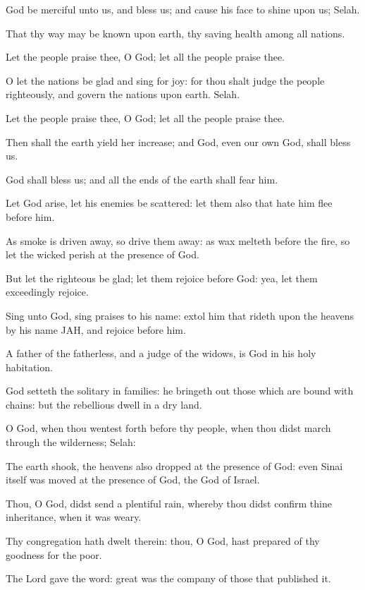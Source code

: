 \Chapter
\Verse God be merciful unto us, and bless us; and cause his face to shine upon us; Selah.

\Verse That thy way may be known upon earth, thy saving health among all nations.

\Verse Let the people praise thee, O God; let all the people praise thee.

\Verse O let the nations be glad and sing for joy: for thou shalt judge the people righteously, and govern the nations upon earth. Selah.

\Verse Let the people praise thee, O God; let all the people praise thee.

\Verse Then shall the earth yield her increase; and God, even our own God, shall bless us.

\Verse God shall bless us; and all the ends of the earth shall fear him.




\Chapter
\Verse Let God arise, let his enemies be scattered: let them also that hate him flee before him.

\Verse As smoke is driven away, so drive them away: as wax melteth before the fire, so let the wicked perish at the presence of God.

\Verse But let the righteous be glad; let them rejoice before God: yea, let them exceedingly rejoice.

\Verse Sing unto God, sing praises to his name: extol him that rideth upon the heavens by his name JAH, and rejoice before him.

\Verse A father of the fatherless, and a judge of the widows, is God in his holy habitation.

\Verse God setteth the solitary in families: he bringeth out those which are bound with chains: but the rebellious dwell in a dry land.

\Verse O God, when thou wentest forth before thy people, when thou didst march through the wilderness; Selah:

\Verse The earth shook, the heavens also dropped at the presence of God: even Sinai itself was moved at the presence of God, the God of Israel.

\Verse Thou, O God, didst send a plentiful rain, whereby thou didst confirm thine inheritance, when it was weary.

\Verse Thy congregation hath dwelt therein: thou, O God, hast prepared of thy goodness for the poor.

\Verse The Lord gave the word: great was the company of those that published it.

